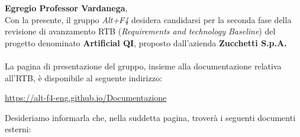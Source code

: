 \documentclass[a4paper, 12pt]{article}
\begin{document}
\primapagina

\newpage

\noindent
\textbf{Egregio Professor Vardanega}, \\
Con la presente, il gruppo \textit{Alt+F4} desidera candidarsi per la seconda fase della revisione di avanzamento RTB (\textit{Requirements and technology Baseline}) del progetto denominato \textbf{Artificial QI}, proposto dall'azienda  \textbf{Zucchetti S.p.A.}\\
\\
La pagina di presentazione del gruppo, insieme alla documentazione relativa all'RTB, è disponibile al seguente indirizzo: 
\begin{center}
    \href{https://alt-f4-eng.github.io/Documentazione}{https://alt-f4-eng.github.io/Documentazione}\\
\end{center}
Desideriamo informarla che, nella suddetta pagina, troverà i seguenti documenti esterni:
\end{document}
